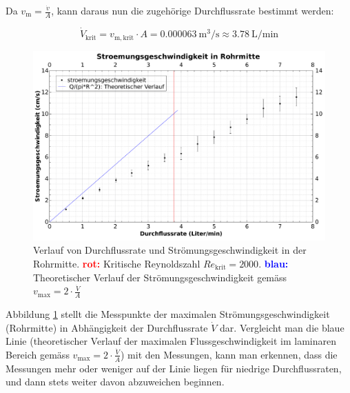 Da $v_{\mathrm{m}} = \frac{\dot{v}}{A}$, kann daraus nun die zugeh\"orige Durchflussrate
bestimmt werden:

\begin{equation}
    \label{eq:Q:reynolds_krit}
    \dot{V}_{\mathrm{krit}} = v_{\mathrm{m,krit}} \cdot A = \SI{0.000063}{\cubic\meter\per\second} \approx \SI{3.78}{\liter\per\minute}
\end{equation}

\clearpage
\begin{figure}
    \centering
    \includegraphics[width=\textwidth]{images/rohrmitte.pdf}
    \caption{%
        Verlauf    von     Durchflussrate    und    Str\"omungsgeschwindigkeit
        in     der     Rohrmitte.     \textcolor{red}{\textbf{rot:}} Kritische
        Reynoldszahl        $\mathit{Re}_{\mathrm{krit}}       =        2000$.
        \textcolor{blue}{\textbf{blau:}} Theoretischer    Verlauf    der
        Str\"omungsgeschwindigkeit  gem\"ass   $v_{\mathrm{max}}  =   2  \cdot
        \frac{\dot{V}}{A}$
    }
    \label{fig:flowspeed:middle}
\end{figure}

\nopagebreak
Abbildung  \ref{fig:flowspeed:middle}  stellt  die  Messpunkte  der  maximalen
Str\"omungsgeschwindigkeit  (Rohrmitte) in  Abh\"angigkeit der  Durchflussrate
$\dot{V}$  dar.  Vergleicht  man die  blaue Linie  (theoretischer Verlauf  der
maximalen Flussgeschwindigkeit im laminaren Bereich gem\"ass $v_{\mathrm{max}}
=  2 \cdot  \frac{\dot{V}}{A}$) mit  den  Messungen, kann  man erkennen,  dass
die  Messungen  mehr  oder  weniger   auf  der  Linie  liegen  f\"ur  niedrige
Durchflussraten, und dann stets weiter davon abzuweichen beginnen.



